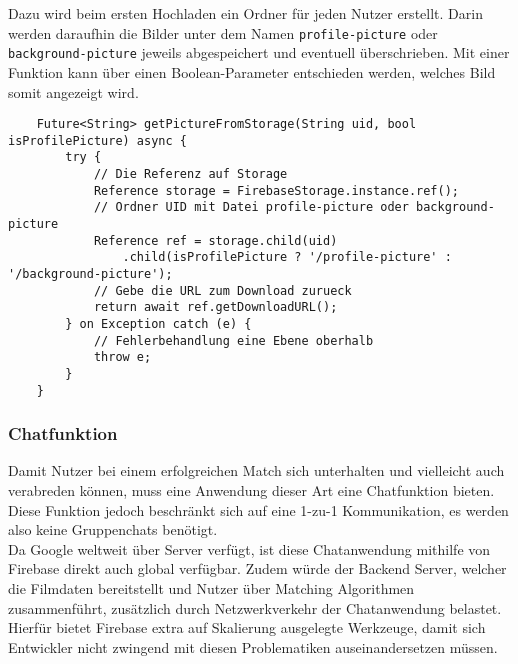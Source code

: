 Dazu wird beim ersten Hochladen ein Ordner für jeden Nutzer erstellt.
Darin werden daraufhin die Bilder unter dem Namen \texttt{profile-picture} oder \texttt{background-picture} jeweils abgespeichert und eventuell überschrieben.
Mit einer Funktion kann über einen Boolean-Parameter entschieden werden, welches Bild somit angezeigt wird.
\medspace
\begin{lstlisting}
	Future<String> getPictureFromStorage(String uid, bool isProfilePicture) async {
		try {
			// Die Referenz auf Storage
			Reference storage = FirebaseStorage.instance.ref();
			// Ordner UID mit Datei profile-picture oder background-picture
			Reference ref = storage.child(uid)
				.child(isProfilePicture ? '/profile-picture' : '/background-picture');
			// Gebe die URL zum Download zurueck
			return await ref.getDownloadURL();
		} on Exception catch (e) {
			// Fehlerbehandlung eine Ebene oberhalb
			throw e;
		}
	}
\end{lstlisting}
\medspace
\subsubsection{Chatfunktion}
Damit Nutzer bei einem erfolgreichen Match sich unterhalten und vielleicht auch verabreden können, muss eine Anwendung dieser Art eine Chatfunktion bieten.
Diese Funktion jedoch beschränkt sich auf eine 1-zu-1 Kommunikation, es werden also keine Gruppenchats benötigt.\\

Da Google weltweit über Server verfügt, ist diese Chatanwendung mithilfe von Firebase direkt auch global verfügbar.
Zudem würde der Backend Server, welcher die Filmdaten bereitstellt und Nutzer über Matching Algorithmen zusammenführt, zusätzlich durch Netzwerkverkehr der Chatanwendung belastet.
Hierfür bietet Firebase extra auf Skalierung ausgelegte Werkzeuge, damit sich Entwickler nicht zwingend mit diesen Problematiken auseinandersetzen müssen.

